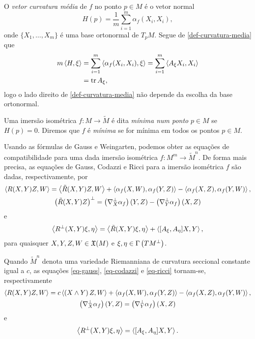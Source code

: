\begin{definicao}
	O \emph{vetor curvatura média} de $f$ no ponto $p \in M$ é o vetor normal
	\begin{equation}\label{def-curvatura-media}
		H(p) = \frac{1}{m} \sum_{i=1}^{m} \alpha_f (X_i, X_i),
	\end{equation}
	onde $\{ X_1, \ldots, X_m \}$ é uma base ortonormal de $T_p M$. Segue de \eqref{def-curvatura-media} que
	\begin{align*}
		m \left\langle H,\xi \right\rangle &= \sum_{i=1}^{m} \left\langle \alpha_f (X_i, X_i),\xi \right\rangle = \sum_{i=1}^{m} \left\langle A_\xi X_i,X_i \right\rangle\\
		&= \operatorname{tr} A_\xi,
	\end{align*}
	logo o lado direito de \eqref{def-curvatura-media} não depende da escolha da base ortonormal.
\end{definicao}

\begin{definicao}
	Uma imersão isométrica $f: M \rightarrow \tilde{M}$ é dita \emph{mínima num ponto} $p \in M$ se $H(p)=0$. Diremos que $f$ é \emph{mínima} se for mínima em todos os pontos $p \in M$.
\end{definicao}

Usando as fórmulas de Gauss e Weingarten, podemos obter as equações de compatibilidade para uma dada imersão isométrica $f: M^m \rightarrow \tilde{M}^n$. De forma mais precisa, as equações de Gauss, Codazzi e Ricci para a imersão isométrica $f$ são dadas, respectivamente, por
\begin{gather}\label{eq-gauss}
	\left\langle R(X,Y)Z,W \right\rangle = \left\langle \tilde{R}(X,Y)Z,W \right\rangle + \left\langle \alpha_f (X,W),\alpha_f(Y,Z) \right\rangle - \left\langle \alpha_f (X,Z),\alpha_f (Y,W) \right\rangle,\\
	\label{eq-codazzi}
	\left( \tilde{R}(X,Y)Z \right)^\perp = \left( \nabla^\perp_X \alpha_f \right)(Y,Z) - \left( \nabla^\perp_Y \alpha_f \right)(X,Z)
\end{gather}
e
\begin{equation}\label{eq-ricci}
	\left\langle R^\perp (X,Y) \xi,\eta \right\rangle = \left\langle \tilde{R}(X,Y) \xi,\eta \right\rangle + \left\langle [A_\xi, A_\eta] X,Y \right\rangle,
\end{equation}
para quaisquer $X,Y,Z,W \in \mathfrak{X}(M)$ e $\xi, \eta \in \Gamma \left( TM^\perp \right)$.

Quando $\tilde{M}^n$ denota uma variedade Riemanniana de curvatura seccional constante igual a $c$, as equações \eqref{eq-gauss}, \eqref{eq-codazzi} e \eqref{eq-ricci} tornam-se, respectivamente
\begin{gather}\label{eq-gauss-em-formas-espaciais}
\left\langle R(X,Y)Z,W \right\rangle = c \left\langle \left( X \wedge Y \right) Z,W \right\rangle + \left\langle \alpha_f (X,W),\alpha_f(Y,Z) \right\rangle - \left\langle \alpha_f (X,Z),\alpha_f (Y,W) \right\rangle,\\
\label{eq-codazzi-em-formas-espaciais}
\left( \nabla^\perp_X \alpha_f \right)(Y,Z) = \left( \nabla^\perp_Y \alpha_f \right)(X,Z)
\end{gather}
e
\begin{equation}\label{eq-ricci-em-formas-espaciais}
\left\langle R^\perp (X,Y) \xi,\eta \right\rangle = \left\langle [A_\xi, A_\eta] X,Y \right\rangle.
\end{equation}

